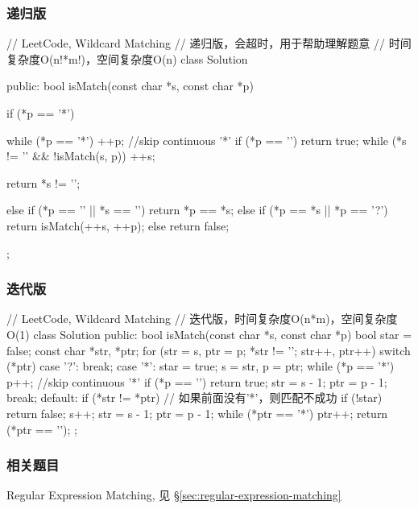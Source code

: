 \subsubsection{递归版}
\begin{Code}
// LeetCode, Wildcard Matching
// 递归版，会超时，用于帮助理解题意
// 时间复杂度O(n!*m!)，空间复杂度O(n)
class Solution {
public:
    bool isMatch(const char *s, const char *p) {
        if (*p == '*') {
            while (*p == '*') ++p;  //skip continuous '*'
            if (*p == '\0') return true;
            while (*s != '\0' && !isMatch(s, p)) ++s;

            return *s != '\0';
        }
        else if (*p == '\0' || *s == '\0') return *p == *s;
        else if (*p == *s || *p == '?') return isMatch(++s, ++p);
        else return false;
    }
};
\end{Code}


\subsubsection{迭代版}
\begin{Code}
// LeetCode, Wildcard Matching
// 迭代版，时间复杂度O(n*m)，空间复杂度O(1)
class Solution {
public:
    bool isMatch(const char *s, const char *p) {
        bool star = false;
        const char *str, *ptr;
        for (str = s, ptr = p; *str != '\0'; str++, ptr++) {
            switch (*ptr) {
            case '?':
                break;
            case '*':
                star = true;
                s = str, p = ptr;
                while (*p == '*') p++;  //skip continuous '*'
                if (*p == '\0') return true;
                str = s - 1;
                ptr = p - 1;
                break;
            default:
                if (*str != *ptr) {
                    // 如果前面没有'*'，则匹配不成功
                    if (!star) return false;
                    s++;
                    str = s - 1;
                    ptr = p - 1;
                }
            }
        }
        while (*ptr == '*') ptr++;
        return (*ptr == '\0');
    }
};
\end{Code}


\subsubsection{相关题目}
\begindot
\item Regular Expression Matching, 见 \S \ref{sec:regular-expression-matching}
\myenddot


